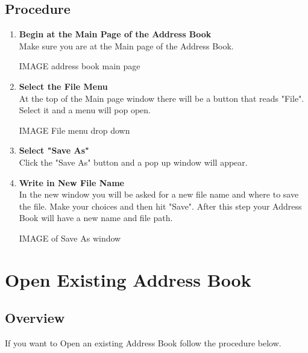 \documentclass[a4paper, 11pt]{article}
\newlength{\drop}
\begin{document}
\subsection{Procedure}
\begin{enumerate}[label=\textbf{\arabic*})]
    \item{\textbf{Begin at the Main Page of the Address Book}}\\ Make sure you are at the Main page of the Address Book.
    
    IMAGE address book main page
    
    \item{\textbf{Select the File Menu}}\\ At the top of the Main page window there will be a button that reads "File". Select it and a menu will pop open.
    
    IMAGE File menu drop down  
    
    \item{\textbf{Select "Save As"}}\\ Click the "Save As" button and a pop up window will appear.
    
    \item{\textbf{Write in New File Name}}\\ In the new window you will be asked for a new file name and where to save the file. Make your choices and then hit "Save". After this step your Address Book will have a new name and file path.
    
    IMAGE of Save As window 
\end{enumerate}


\section{Open Existing Address Book}
\subsection{Overview}
If you want to Open an existing Address Book follow the procedure below.
\end{document}

